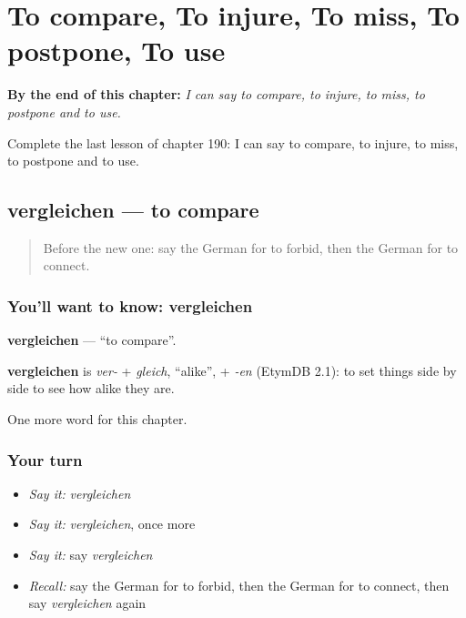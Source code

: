 
\chapter{To compare, To injure, To miss, To postpone, To use}
\label{ch:ge-to-compare-to-injure-to-miss-to-postpone-to-use}

\begin{chapteropening}
\textbf{By the end of this chapter:} \emph{I can say to compare, to injure, to miss, to postpone and to use.}

Complete the last lesson of chapter 190: I can say to compare, to injure, to miss, to postpone and to use.
\end{chapteropening}

\section[vergleichen]{vergleichen — to compare}

\label{lesson:GE-C190-vergleichen}



\begin{quote}
Before the new one: say the German for to forbid, then the German for to connect.
\end{quote}

\subsection*{You'll want to know: vergleichen}
\textbf{vergleichen} — \textquotedblleft{}to compare\textquotedblright{}.

\begin{cousinweb}
\textbf{vergleichen} is \emph{ver-} + \emph{gleich}, \textquotedblleft{}alike\textquotedblright{}, + \emph{-en} (EtymDB 2.1): to set things side by side to see how alike they are.
\end{cousinweb}

\begin{grammarlens}[title={What you've built}]
One more word for this chapter.
\end{grammarlens}

\subsection*{Your turn}
\begin{itemize}
\raggedright
  \item \emph{Say it:} \emph{vergleichen}
  \item \emph{Say it:} \emph{vergleichen}, once more
  \item \emph{Say it:} say \emph{vergleichen}
  \item \emph{Recall:} say the German for to forbid, then the German for to connect, then say \emph{vergleichen} again
\end{itemize}

